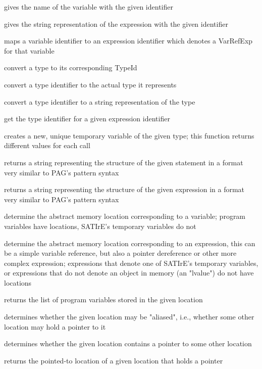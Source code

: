 \documentclass[a4paper,12pt]{report}
\begin{document}
\begin{description}
    gives the name of the variable with the given identifier

    gives the string representation of the expression with the given
    identifier

    maps a variable identifier to an expression identifier which denotes a
    VarRefExp for that variable

    convert a type to its corresponding TypeId

    convert a type identifier to the actual type it represents

    convert a type identifier to a string representation of the type

    get the type identifier for a given expression identifier

    creates a new, unique temporary variable of the given type; this
    function returns different values for each call

    returns a string representing the structure of the given statement in a
    format very similar to PAG's pattern syntax

    returns a string representing the structure of the given expression in a
    format very similar to PAG's pattern syntax

    determine the abstract memory location corresponding to a variable;
    program variables have locations, SATIrE's temporary variables do not

    determine the abstract memory location corresponding to an expression,
    this can be a simple variable reference, but also a pointer dereference
    or other more complex expression; expressions that denote one of
    SATIrE's temporary variables, or expressions that do not denote an
    object in memory (an "lvalue") do not have locations

    returns the list of program variables stored in the given location

    determines whether the given location may be "aliased", i.e., whether
    some other location may hold a pointer to it

    determines whether the given location contains a pointer to some other
    location

    returns the pointed-to location of a given location that holds a pointer
\end{description}
\end{document}
